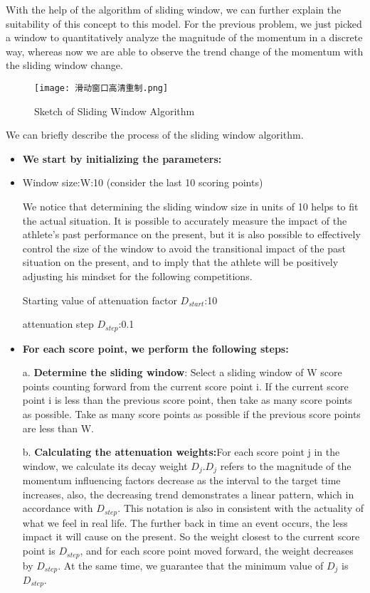 \documentclass{mcmthesis}
\begin{document}
With the help of the algorithm of sliding window, we can further explain the suitability of this
concept to this model. For the previous problem, we just picked a window to quantitatively
analyze the magnitude of the momentum in a discrete way, whereas now we are able to observe
the trend change of the momentum with the sliding window change.

\begin{figure}[htbp]
    \centering
    \texttt{[image: 滑动窗口高清重制.png]}
    \caption{Sketch of Sliding Window Algorithm} \label{Figure 18}
\end{figure}

We can briefly describe the process of the sliding window algorithm.
\begin{itemize}
    \item {\bf We start by initializing the parameters:}
    \item 
    Window size:W:10 (consider the last 10 scoring points)

    We notice that determining the sliding window size in units of 10 helps to fit the actual
    situation. It is possible to accurately measure the impact of the athlete's past performance on
    the present, but it is also possible to effectively control the size of the window to avoid the
    transitional impact of the past situation on the present, and to imply that the athlete will be
    positively adjusting his mindset for the following competitions. 

    Starting value of attenuation factor $D_{start}$:10

    attenuation step $D_{step}$:0.1

    \item {\bf For each score point, we perform the following steps:}
    \item[a.]{\bf Determine the sliding window}: Select a sliding window of W score points counting
    forward from the current score point i. If the current score point i is less than the previous
    score point, then take as many score points as possible. Take as many score points as possible
    if the previous score points are less than W.
    \item[b.]{\bf Calculating the attenuation weights:}For each score point j in the window, we calculate
    its decay weight $D_{j}$.$D_{j}$ refers to the magnitude of the momentum influencing factors decrease
    as the interval to the target time increases, also, the decreasing trend demonstrates a linear
    pattern, which in accordance with $D_{step}$. This notation is also in consistent with the actuality of what we feel in real life. The further back in time an event occurs, the less impact it will
    cause on the present. So the weight closest to the current score point is $D_{step}$, and for each score point moved forward, the weight decreases by $D_{step}$. At the same time, we guarantee
    that the minimum value of $D_{j}$ is $D_{step}$.


\end{itemize}
\end{document}
